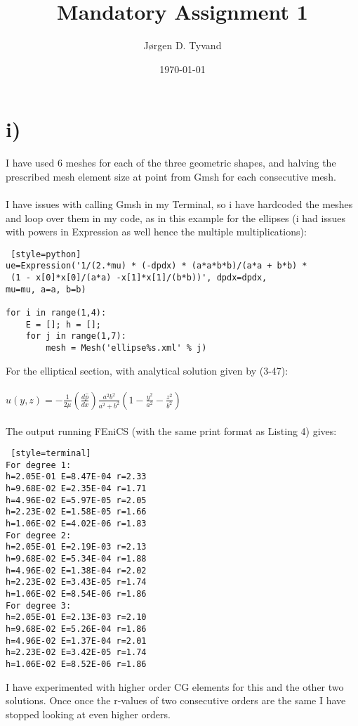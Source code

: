 \documentclass[a4paper,english,11pt,twoside]{article}
\date{\today}
\title{Mandatory Assignment 1}
\author{Jørgen D. Tyvand}
\begin{document}
\maketitle
\newpage

\section*{i)}
I have used 6 meshes for each of the three geometric shapes, and halving the prescribed mesh element size at point from Gmsh for each consecutive mesh.\\
\\
I have issues with calling Gmsh in my Terminal, so i have hardcoded the meshes and loop over them in my code, as in this example for the ellipses (i had issues with powers in Expression as well hence the multiple multiplications):
\begin{lstlisting} [style=python]
ue=Expression('1/(2.*mu) * (-dpdx) * (a*a*b*b)/(a*a + b*b) *
 (1 - x[0]*x[0]/(a*a) -x[1]*x[1]/(b*b))', dpdx=dpdx, 
mu=mu, a=a, b=b)

for i in range(1,4):
	E = []; h = [];
	for j in range(1,7):
		mesh = Mesh('ellipse%s.xml' % j)
\end{lstlisting}
For the elliptical section, with analytical solution given by (3-47):\\
\\
$u(y,z) = -\frac{1}{2\mu}\left(\frac{d\hat{p}}{dx}\right)\frac{a^2b^2}{a^2 + b^2}\left(1 - \frac{y^2}{a^2} - \frac{z^2}{b^2}\right)$\\
\\
The output running FEniCS (with the same print format as Listing 4) gives:
\begin{lstlisting} [style=terminal]
For degree 1:
h=2.05E-01 E=8.47E-04 r=2.33
h=9.68E-02 E=2.35E-04 r=1.71
h=4.96E-02 E=5.97E-05 r=2.05
h=2.23E-02 E=1.58E-05 r=1.66
h=1.06E-02 E=4.02E-06 r=1.83
For degree 2:
h=2.05E-01 E=2.19E-03 r=2.13
h=9.68E-02 E=5.34E-04 r=1.88
h=4.96E-02 E=1.38E-04 r=2.02
h=2.23E-02 E=3.43E-05 r=1.74
h=1.06E-02 E=8.54E-06 r=1.86
For degree 3:
h=2.05E-01 E=2.13E-03 r=2.10
h=9.68E-02 E=5.26E-04 r=1.86
h=4.96E-02 E=1.37E-04 r=2.01
h=2.23E-02 E=3.42E-05 r=1.74
h=1.06E-02 E=8.52E-06 r=1.86
\end{lstlisting}
I have experimented with higher order CG elements for this and the other two solutions. Once once the r-values of two consecutive orders are the same I have stopped looking at even higher orders.\\
\end{document}
